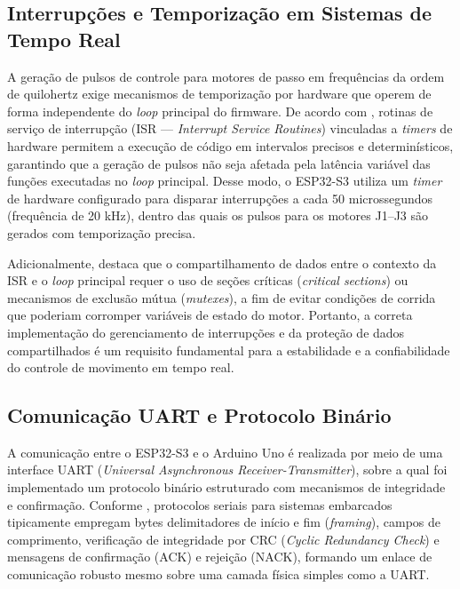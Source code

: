 \subsection{Interrupções e Temporização em Sistemas de Tempo Real}

A geração de pulsos de controle para motores de passo em frequências da ordem de quilohertz exige mecanismos de temporização por hardware que operem de forma independente do \textit{loop} principal do firmware. De acordo com , rotinas de serviço de interrupção (ISR — \textit{Interrupt Service Routines}) vinculadas a \textit{timers} de hardware permitem a execução de código em intervalos precisos e determinísticos, garantindo que a geração de pulsos não seja afetada pela latência variável das funções executadas no \textit{loop} principal. Desse modo, o ESP32-S3 utiliza um \textit{timer} de hardware configurado para disparar interrupções a cada 50 microssegundos (frequência de 20 kHz), dentro das quais os pulsos para os motores J1–J3 são gerados com temporização precisa.

Adicionalmente,  destaca que o compartilhamento de dados entre o contexto da ISR e o \textit{loop} principal requer o uso de seções críticas (\textit{critical sections}) ou mecanismos de exclusão mútua (\textit{mutexes}), a fim de evitar condições de corrida que poderiam corromper variáveis de estado do motor. Portanto, a correta implementação do gerenciamento de interrupções e da proteção de dados compartilhados é um requisito fundamental para a estabilidade e a confiabilidade do controle de movimento em tempo real.

\subsection{Comunicação UART e Protocolo Binário}

A comunicação entre o ESP32-S3 e o Arduino Uno é realizada por meio de uma interface UART (\textit{Universal Asynchronous Receiver-Transmitter}), sobre a qual foi implementado um protocolo binário estruturado com mecanismos de integridade e confirmação. Conforme , protocolos seriais para sistemas embarcados tipicamente empregam bytes delimitadores de início e fim (\textit{framing}), campos de comprimento, verificação de integridade por CRC (\textit{Cyclic Redundancy Check}) e mensagens de confirmação (ACK) e rejeição (NACK), formando um enlace de comunicação robusto mesmo sobre uma camada física simples como a UART.

